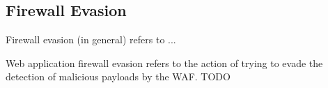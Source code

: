\subsection{Firewall Evasion}
Firewall evasion (in general) refers to ...

Web application firewall evasion refers to the action of trying to evade the detection of malicious payloads by the WAF. {\color{red} TODO}

